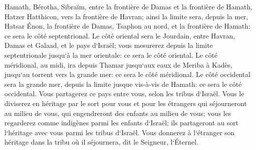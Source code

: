 \verse Hamath, Bérotha, Sibraïm, entre la frontière de Damas et la frontière de Hamath, Hatzer Hatthicon, vers la frontière de Havran; 
\verse ainsi la limite sera, depuis la mer, Hatsar Énon, la frontière de Damas, Tsaphon au nord, et la frontière de Hamath: ce sera le côté septentrional. 
\verse Le côté oriental sera le Jourdain, entre Havran, Damas et Galaad, et le pays d`Israël; vous mesurerez depuis la limite septentrionale jusqu`à la mer orientale: ce sera le côté oriental. 
\verse Le côté méridional, au midi, ira depuis Thamar jusqu`aux eaux de Meriba à Kadès, jusqu`au torrent vers la grande mer: ce sera le côté méridional. 
\verse Le côté occidental sera la grande mer, depuis la limite jusque vis-à-vis de Hamath: ce sera le côté occidental. 
\verse Vous partagerez ce pays entre vous, selon les tribus d`Israël. 
\verse Vous le diviserez en héritage par le sort pour vous et pour les étrangers qui séjourneront au milieu de vous, qui engendreront des enfants au milieu de vous; vous les regarderez comme indigènes parmi les enfants d`Israël; ils partageront au sort l`héritage avec vous parmi les tribus d`Israël. 
\verse Vous donnerez à l`étranger son héritage dans la tribu où il séjournera, dit le Seigneur, l`Éternel. 

\chapter{}

